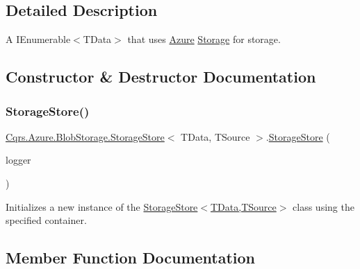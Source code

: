 \subsection{Detailed Description}
A I\+Enumerable$<$\+T\+Data$>$ that uses \hyperlink{namespaceCqrs_1_1Azure}{Azure} \hyperlink{namespaceCqrs_1_1Azure_1_1Storage}{Storage} for storage. 



\subsection{Constructor \& Destructor Documentation}
\mbox{\label{classCqrs_1_1Azure_1_1BlobStorage_1_1StorageStore_ae7a725cdcb7de73e097b02c19463bae7_ae7a725cdcb7de73e097b02c19463bae7}} 
\subsubsection{\texorpdfstring{Storage\+Store()}{StorageStore()}}
{\footnotesize\ttfamily \hyperlink{classCqrs_1_1Azure_1_1BlobStorage_1_1StorageStore}{Cqrs.\+Azure.\+Blob\+Storage.\+Storage\+Store}$<$ T\+Data, T\+Source $>$.\hyperlink{classCqrs_1_1Azure_1_1BlobStorage_1_1StorageStore}{Storage\+Store} (\begin{DoxyParamCaption}\item[{I\+Logger}]{logger }\end{DoxyParamCaption})\hspace{0.3cm}{\ttfamily [protected]}}



Initializes a new instance of the \hyperlink{classCqrs_1_1Azure_1_1BlobStorage_1_1StorageStore_ae7a725cdcb7de73e097b02c19463bae7_ae7a725cdcb7de73e097b02c19463bae7}{Storage\+Store$<$\+T\+Data,\+T\+Source$>$} class using the specified container. 



\subsection{Member Function Documentation}
\mbox{\label{classCqrs_1_1Azure_1_1BlobStorage_1_1StorageStore_af56bdbd7fa6650aaef5c0bab9ed55f1a_af56bdbd7fa6650aaef5c0bab9ed55f1a}} 
